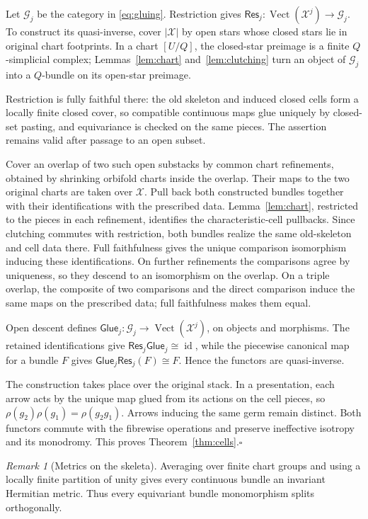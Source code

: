 \documentclass[11pt,a4paper,reqno]{amsart}
\numberwithin{equation}{section}
\theoremstyle{remark}
\newtheorem{remark}[theorem]{Remark}
\theoremstyle{plain}
\newcommand{\X}{\mathcal X}
\newcommand{\Vect}{\operatorname{Vect}}
\newcommand{\id}{\operatorname{id}}
\begin{document}
Let $\mathcal G_j$ be the category in \eqref{eq:gluing}. Restriction gives
$\mathsf{Res}_j:\Vect(\X^j)\to\mathcal G_j$. To construct its quasi-inverse,
cover $|\X|$ by open stars whose closed stars lie in original chart
footprints. In a chart $[U/Q]$, the closed-star preimage is a finite
$Q$-simplicial complex; Lemmas~\ref{lem:chart} and~\ref{lem:clutching} turn
an object of $\mathcal G_j$ into a $Q$-bundle on its open-star preimage.

Restriction is fully faithful there: the old skeleton and induced closed
cells form a locally finite closed cover, so compatible continuous maps glue
uniquely by closed-set pasting, and equivariance is checked on the same
pieces. The assertion remains valid after passage to an open subset.

Cover an overlap of two such open substacks by common chart refinements,
obtained by shrinking orbifold charts inside the overlap. Their maps to the
two original charts are taken over $\X$. Pull back both constructed bundles
together with their identifications with the prescribed data.
Lemma~\ref{lem:chart}, restricted to the pieces in each refinement, identifies
the characteristic-cell pullbacks. Since clutching commutes with restriction,
both bundles realize the same old-skeleton and cell data there. Full
faithfulness gives the unique comparison isomorphism inducing these
identifications. On further refinements the comparisons agree by uniqueness,
so they descend to an isomorphism on the overlap. On a triple overlap, the
composite of two comparisons and the direct comparison induce the same maps
on the prescribed data; full faithfulness makes them equal.

Open descent defines
$\mathsf{Glue}_j:\mathcal G_j\to\Vect(\X^j)$, on objects and morphisms. The
retained identifications give
$\mathsf{Res}_j\mathsf{Glue}_j\cong\id$, while the piecewise canonical map
for a bundle $F$ gives
$\mathsf{Glue}_j\mathsf{Res}_j(F)\cong F$. Hence the functors are
quasi-inverse.

The construction takes place over the original stack. In a presentation,
each arrow acts by the unique map glued from its actions on the cell pieces, so
$\rho(g_2)\rho(g_1)=\rho(g_2g_1)$. Arrows inducing the same germ remain
distinct. Both functors commute with the fibrewise operations and preserve
ineffective isotropy and its monodromy. This proves
Theorem~\ref{thm:cells}.\hfill$\square$

\begin{remark}[Metrics on the skeleta]\label{rem:metrics}
Averaging over finite chart groups and using a locally finite partition of
unity gives every continuous bundle an invariant Hermitian metric. Thus every
equivariant bundle monomorphism splits orthogonally.
\end{remark}
\end{document}
